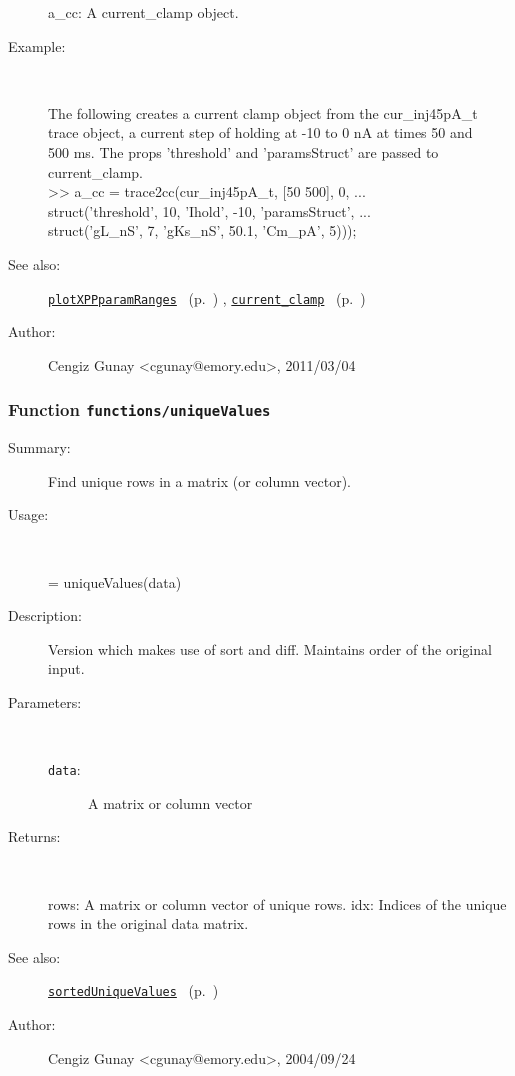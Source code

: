\begin{description}
   a\_cc: A current\_clamp object.
%
\item[Example:]~
\begin{lyxcode} The following creates a current clamp object from the cur\_inj45pA\_t
\\%
 trace object, a current step of holding at -10 to 0 nA at times 50 and
\\%
 500 ms. The props 'threshold' and 'paramsStruct' are passed to current\_clamp.
\\%
 >> a\_cc = trace2cc(cur\_inj45pA\_t, [50 500], 0, ...
\\%
                struct('threshold', 10, 'Ihold', -10, 'paramsStruct', ...
\\%
                       struct('gL\_nS', 7, 'gKs\_nS', 50.1, 'Cm\_pA', 5)));
\\%
\end{lyxcode}
%
\item[See also:]%
\hyperlink{ref_plotXPPparamRanges}{\texttt{plotXPPparamRanges}}%
\ (p.~\pageref{ref_plotXPPparamRanges})%
%
, \hyperlink{ref_current_clamp}{\texttt{current\_clamp}}%
\ (p.~\pageref{ref_current_clamp})%
%
%
\item[Author:]%
Cengiz Gunay <cgunay@emory.edu>, 2011/03/04
%
\end{description}
\methodline%
\subsubsection[Function \texttt{uniqueValues}]{Function \texttt{functions/uniqueValues}}%
%
\label{ref_functions__uniqueValues}%
\hypertarget{ref_functions__uniqueValues}{}%
\begin{description}
\item[Summary:]Find unique rows in a matrix (or column vector). 
%
\item[Usage:]~%
\begin{lyxcode}%
[rows, idx] = uniqueValues(data)
%
\end{lyxcode}%
%
\item[Description:]%
Version which makes use of sort and diff. Maintains order of the
 original input.
\item[Parameters:]~
\begin{description}%
\item[\texttt{data}:]
 A matrix or column vector
\end{description}%
%
\item[Returns:
]~

   rows: A matrix or column vector of unique rows.
   idx: Indices of the unique rows in the original data matrix.
%
%
\item[See also:]%
\hyperlink{ref_sortedUniqueValues}{\texttt{sortedUniqueValues}}%
\ (p.~\pageref{ref_sortedUniqueValues})%
%
%
\item[Author:]%
Cengiz Gunay <cgunay@emory.edu>, 2004/09/24
%
\end{description}
\methodline%
